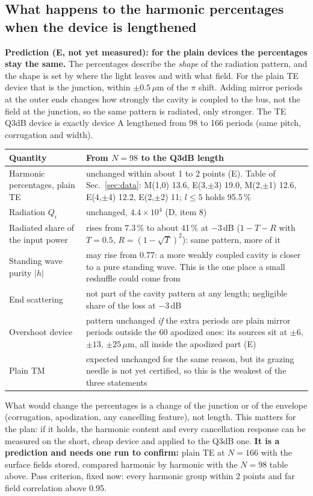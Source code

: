 \documentclass[11pt,a4paper]{article}
\begin{document}
\subsection*{What happens to the harmonic percentages when the device is lengthened}
\textbf{Prediction (E, not yet measured): for the plain devices the percentages stay the same.} The percentages
describe the \emph{shape} of the radiation pattern, and the shape is set by where the light leaves and with
what field. For the plain TE device that is the junction, within $\pm0.5$\,$\mu$m of the $\pi$ shift. Adding
mirror periods at the outer ends changes how strongly the cavity is coupled to the bus, not the field at the
junction, so the same pattern is radiated, only stronger. The TE Q3dB device is exactly device A lengthened
from 98 to 166 periods (same pitch, corrugation and width).
\begin{center}\small\begin{tabular}{p{5.3cm}p{9.2cm}}\hline
Quantity & From $N=98$ to the Q3dB length\\\hline
Harmonic percentages, plain TE & unchanged within about 1 to 2 points (E). Table of Sec.~\ref{sec:data}: M(1,0) 13.6,
E(3,$\pm$3) 19.0, M(2,$\pm$1) 12.6, E(4,$\pm$4) 12.2, E(2,$\pm$2) 11; $l\le5$ holds 95.5\,\%\\
Radiation $Q_i$ & unchanged, $4.4\times10^4$ (D, item 8)\\
Radiated share of the input power & rises from 7.3\,\% to about 41\,\% at $-3$\,dB ($1-T-R$ with $T=0.5$,
$R=(1-\sqrt T)^2$): same pattern, more of it\\
Standing wave purity $|h|$ & may rise from 0.77: a more weakly coupled cavity is closer to a pure standing wave.
This is the one place a small reshuffle could come from\\
End scattering & not part of the cavity pattern at any length; negligible share of the loss at $-3$\,dB\\
Overshoot device & pattern unchanged \emph{if} the extra periods are plain mirror periods outside the 60
apodized ones: its sources sit at $\pm6$, $\pm13$, $\pm25$\,$\mu$m, all inside the apodized part (E)\\
Plain TM & expected unchanged for the same reason, but its grazing needle is not yet certified, so this is the
weakest of the three statements\\\hline
\end{tabular}\end{center}
What would change the percentages is a change of the junction or of the envelope (corrugation, apodization,
any cancelling feature), not length. This matters for the plan: if it holds, the harmonic content and every
cancellation response can be measured on the short, cheap device and applied to the Q3dB one. \textbf{It is a
prediction and needs one run to confirm:} plain TE at $N=166$ with the surface fields stored, compared harmonic
by harmonic with the $N=98$ table above. Pass criterion, fixed now: every harmonic group within 2 points and
far field correlation above 0.95.
\end{document}
